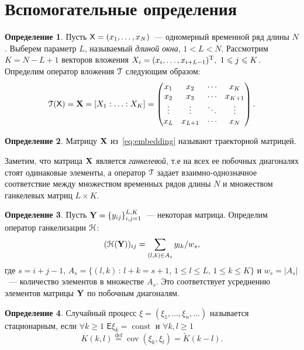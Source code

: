 \documentclass[specialist,
substylefile = spbu.rtx,
               subf,href,colorlinks=true, 12pt]{disser}
\theoremstyle{definition}
\newtheorem{definition}{Определение}
\begin{document}
\section{Вспомогательные определения}\label{sect:definitions}
\begin{definition}
	Пусть $\mathsf{X}=(x_1,\ldots,x_N)$~--- одномерный временной ряд длины $N$. Выберем параметр $L$, называемый \emph{длиной окна}, $1<L<N$. Рассмотрим $K=N-L+1$ векторов вложения $X_i=(x_{i},\ldots, x_{i+L-1})^{\mathrm{T}},\ 1\leqslant j \leqslant K$. Определим оператор вложения $\EuScript{T}$ следующим образом:
	\begin{equation}\label{eq:embedding}
		\EuScript{T}(\mathsf{X})=\mathbf{X}=[X_1:\ldots:X_K]=
		\begin{pmatrix}
			x_1    & x_2     & \cdots & x_K     \\
			x_2    & x_3     & \cdots & x_{K+1} \\
			\vdots & \vdots  & \ddots & \vdots  \\
			x_L    & x_{L+1} & \cdots & x_N
		\end{pmatrix}.
	\end{equation}
\end{definition}
\begin{definition}
	Матрицу $\mathbf{X}$ из~\eqref{eq:embedding} называют траекторной матрицей.
\end{definition}\noindent
Заметим, что матрица $\mathbf{X}$ является \emph{ганкелевой}, т.е на всех ее побочных диагоналях стоят одинаковые элементы, а оператор $\EuScript{T}$ задает взаимно-однозначное соответствие между множеством временных рядов длины $N$ и множеством ганкелевых матриц $L\times K$.
\begin{definition}
	Пусть $\mathbf{Y}=\{y_{ij}\}_{i,j=1}^{L,K}$~--- некоторая матрица. Определим оператор ганкелизации $\EuScript{H}$:
	\begin{equation}\label{eq:averaging}
		(\EuScript{H}(\mathbf{Y}))_{ij}=\sum_{(l,k)\in A_s}y_{lk}/w_s,
	\end{equation}
	где $s=i+j-1$, $A_s=\{(l,k)\, :\, l+k=s+1,\, 1\leqslant l\leqslant L,\, 1\leqslant k\leqslant K\}$ и $w_s=|A_s|$~--- количество элементов в множестве $A_s$. Это соответствует
	усреднению элементов матрицы $\mathbf{Y}$ по побочным диагоналям.
\end{definition}
\begin{definition}\label{def:stationaty_random}
	Случайный процесс $\xi=(\xi_1,\ldots, \xi_n,\ldots)$ называется стационарным, если $\forall k\geqslant1$ $\mathsf E\xi_k=\operatorname{const}$ и $\forall k,l\geqslant1$
	\[
	K(k, l)\overset{\text{def}}=\operatorname{cov}(\xi_k, \xi_l)= \widetilde{K}(k-l).
	\]
\end{definition}
\end{document}
